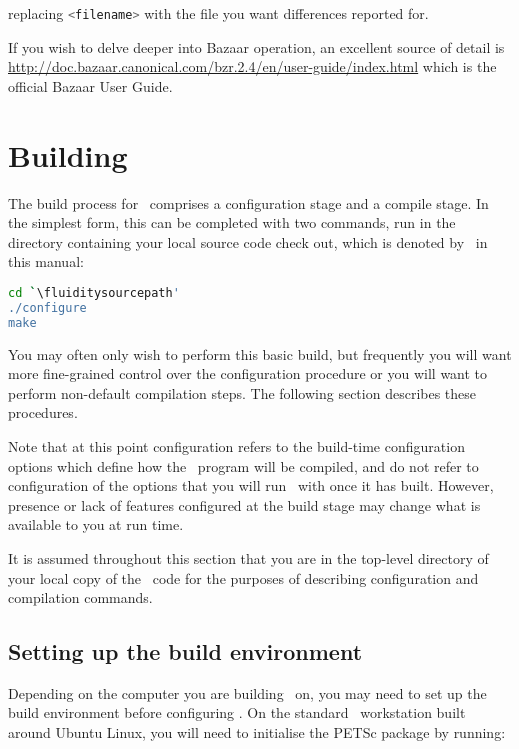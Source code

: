 replacing \lstinline[language=Bash]+<filename>+ with the file you want
differences reported for.

If you wish to delve deeper into Bazaar operation, an excellent source of
detail is
\href{http://doc.bazaar.canonical.com/bzr.2.4/en/user-guide/index.html}
{http://doc.bazaar.canonical.com/bzr.2.4/en/user-guide/index.html}
which is the official Bazaar User Guide.

\section{Building \fluidity}
\label{sec:building_fluidity}

The build process for \fluidity\ comprises a configuration stage and a compile
stage. In the simplest form, this can be completed with two commands, run in
the directory containing your local source code check out, which is denoted
by \fluiditysourcepath\ in this manual:

\begin{lstlisting}[language=Bash]
cd `\fluiditysourcepath' 
./configure
make
\end{lstlisting}

You may often only wish to perform this basic build, but frequently you will
want more fine-grained control over the configuration procedure or you will
want to perform non-default compilation steps. The following section describes
these procedures.

Note that at this point configuration refers to the build-time configuration
options which define how the \fluidity\ program will be compiled, and do not
refer to configuration of the options that you will run \fluidity\ with once it 
has built. However, presence or lack of features configured at the build stage
may change what is available to you at run time.

It is assumed throughout this section that you are in the top-level directory
of your local copy of the \fluidity\ code for the purposes of describing
configuration and compilation commands.

\subsection{Setting up the build environment}

Depending on the computer you are building \fluidity\ on, you may need to set
up the build environment before configuring \fluidity. On the standard
\fluidity\ workstation built around Ubuntu Linux, you will need to initialise
the PETSc package by running:

